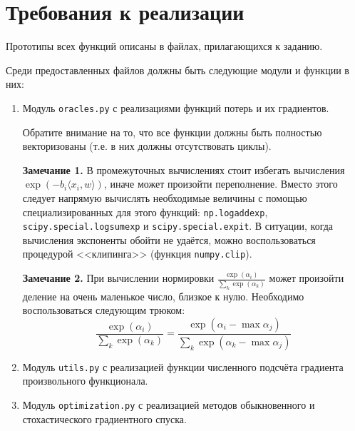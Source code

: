 \documentclass[10pt,fleqn]{article}
\begin{document}
\section*{Требования к реализации}
\label{requirments}

Прототипы всех функций описаны в файлах, прилагающихся к заданию.

Среди предоставленных файлов должны быть следующие модули и функции в них:

\begin{enumerate}

\item Модуль \texttt{oracles.py} с реализациями функций потерь и их градиентов.

 Обратите внимание на то, что все функции должны быть полностью векторизованы (т.е. в них должны отсутствовать циклы).

\textbf{Замечание 1.} В промежуточных вычислениях стоит избегать вычисления $\exp(-b_i \langle x_i , w\rangle)$, иначе может произойти переполнение. Вместо этого следует напрямую вычислять необходимые величины с помощью специализированных для этого функций: \texttt{np.logaddexp}, \texttt{scipy.special.logsumexp} и \texttt{scipy.special.expit}.
В ситуации, когда вычисления экспоненты обойти не удаётся, можно воспользоваться процедурой <<клипинга>> (функция \texttt{numpy.clip}).

\textbf{Замечание 2.} При вычислении нормировки $\frac{\exp(\alpha_i)}{\sum_{k}\exp(\alpha_k)}$ может произойти деление на очень маленькое число, близкое к нулю. Необходимо воспользоваться следующим трюком:
$$
\frac{\exp(\alpha_i)}{\sum_{k}\exp(\alpha_k)} = \frac{\exp(\alpha_i - \max \alpha_j)}{\sum_{k}\exp(\alpha_k - \max \alpha_j)}
$$

\item Модуль \texttt{utils.py} с реализацией функции численного подсчёта градиента произвольного функционала.

\item Модуль \texttt{optimization.py} с реализацией методов обыкновенного и стохастического градиентного спуска.

\end{enumerate}
\end{document}
